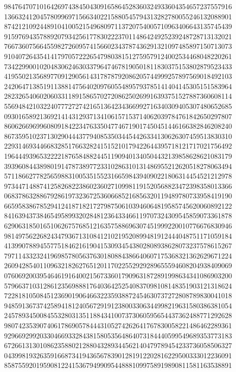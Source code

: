 {{    9847647071016426974384504309165864528360324933604354657237557916 ~
    1366324120457809969715663402215880545794313282780055246132088901 ~
    8742121092448910410052154968097113720754005710963406643135745439 ~
    9159769435788920793425617783022237011486424925239248728713132021 ~
    7667360756645598272609574156602343787436291321097485897150713073 ~
    9104072643541417970572226547980381512759579124002534468048220261 ~
    7342299001020483062463033796474678190501811830375153802879523433 ~
    4195502135689770912905614317878792086205744999257897569018492103 ~
    2420647138519113881475640209760554895793785141404145305151583964 ~
    2823265406020603311891586570272086250269916393751527887360608114 ~
    5569484210322407772727421651364234366992716340309405307480652685 ~
    0930165892136921414312937134106157153714062039784761842650297807 ~
    8606266969960809184223476335047746719017450451446166382846208240 ~
    8673595102371302904443779408535034454426334130626307459513830310 ~
    2293146934466832851766328241515210179422644395718121717021756492 ~
    1964449396532222187658488244511909401340504432139858628621083179 ~
    3939608443898019147873897723310286310131486955212620518278063494 ~
    5711866277825659883100535155231665984394090221806314454521212978 ~
    9734471488741258268223860236027109981191520568823472398358013366 ~
    0683786328867928619732367253606685216856320119489780733958419190 ~
    6659583867852941241871821727987506103946064819585745620060892122 ~
    8416394373846549589932028481236433466119707324309545859073361878 ~
    6290631850165106267576851216357588696307451999220010776676830946 ~
    9814975622682434793671310841210219520899481912444048751171059184 ~
    4139907889455775184621619041530934543802808938628073237578615267 ~
    7971143323241969857805637630180884386640607175368321362629671224 ~
    2609428540110963218262765120117022552929289655594608204938409069 ~
    0760692003954646191640021567336017909631872891998634341086903200 ~
    5796637103128612356988817640364252540837098108148351903121318624 ~
    7228181050845123690190646632235938872454630737272808789830041018 ~
    9485913673742589418124056729191238003306344998219631580386381054 ~
    2457893450084553280313511884341007373060595654437362488771292628 ~
    9807423539074061786905784443105274262641767830058221486462289361 ~
    9296692992033046693328438158053564864073184440599549689353773183 ~
    6726613130108623588021288043289344562140479789454233736058506327 ~
    0439981932635916687341943656783901281912202816229500333012236091 ~
    8587559201959081224153679499095448881099758919890811581163538891 ~
}}
